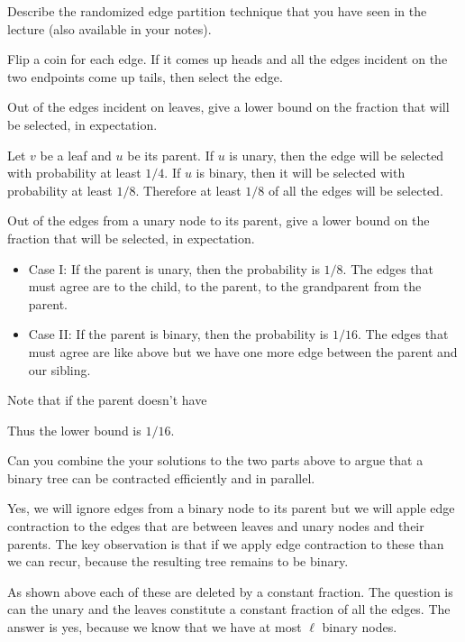 \begin{problem}
\ask[2.]
Describe the randomized edge partition technique that you have seen in
the lecture (also available in your notes). 

\sol
Flip a coin for each edge. If it comes up heads and all the edges
incident on the two endpoints come up tails, then select the edge.


\ask[5.]
Out of the edges incident on leaves, give a lower bound on the
fraction that will be selected, in expectation.

\sol
Let $v$ be a leaf and $u$ be its parent. If $u$ is unary, then the
edge will be selected with probability at least $1/4$.  If $u$ is
binary, then it will be selected with probability at least $1/8$.
Therefore at least $1/8$ of all the edges will be selected.




\ask[5.]
Out of the edges from a unary node to its parent, give a lower bound
on the fraction that will be selected, in expectation.

\sol
\begin{itemize}
\item Case I: If the parent is unary, then the probability is $1/8$.
The edges that must agree are to the child, to the parent, to the
grandparent from the parent.
\item Case II: If the parent is binary, then the probability is
$1/16$. The edges that must agree are like above but we have one more
edge between the parent and our sibling.
\end{itemize}

Note that if the parent doesn't have 

Thus the lower bound is $1/16$.


\end{problem}

\begin{problem}
\ask
Can you combine the your solutions to the two parts above to argue
that a binary tree can be contracted efficiently and in parallel.

\sol
Yes, we will ignore edges from a binary node to its parent but we will
apple edge contraction to the edges that are between leaves and unary
nodes and their parents.  The key observation is that if we apply edge
contraction to these than we can recur, because the resulting
tree remains to be binary.

As shown above each of these are deleted by a constant fraction.  The
question is can the unary and the leaves constitute a constant
fraction of all the edges.  The answer is yes, because we know that we
have at most $\ell$ binary nodes.  
\end{problem}
